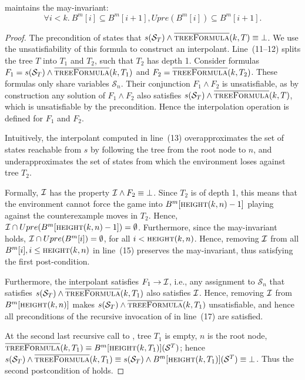 \begin{proposition}
     maintains the may-invariant: $$\forall i<k.~B^m[i] \subseteq B^m[i+1], Upre(B^m[i]) \subseteq B^m[i+1].$$
\end{proposition}
\begin{proof}
    The precondition of  states that $s(\mathcal{S}_T) \land \textsc{$\overline{\mbox{treeFormula}}$}(k, T) \equiv \bot$. We use the unsatisfiability of this formula to construct an interpolant.  Line~(11--12) splits the tree $T$ into $T_1$ and $T_2$, such that $T_2$ has depth 1.  Consider formulas $F_1=s(\mathcal{S}_T) \land \textsc{$\overline{\mbox{treeFormula}}$}(k, T_1)$ and $F_2 = \textsc{$\overline{\mbox{treeFormula}}$}(k, T_2)$.  These formulas only share variables $\mathcal{S}_n$.  Their conjunction $F_1 \land F_2$ is unsatisfiable, as by construction any solution of $F_1 \land F_2$ also satisfies $s(\mathcal{S}_T) \land \textsc{$\overline{\mbox{treeFormula}}$}(k, T)$, which is unsatisfiable by the precondition.  Hence the interpolation operation is defined for $F_1$ and $F_2$.  

Intuitively, the interpolant computed in line~(13) overapproximates the set of states reachable from $s$ by following the tree from the root node to $n$, and underapproximates the set of states from which the environment loses against tree $T_2$.  

Formally, $\mathcal{I}$ has the property $\mathcal{I} \land F_2 \equiv \bot$.  Since $T_2$ is of depth 1, this means that the environment cannot force the game into $B^m[\textsc{height}(k, n)-1]$ playing against the counterexample moves in $T_2$.  Hence, $\mathcal{I} \cap Upre(B^m[\textsc{height}(k, n)-1]) = \emptyset$.  Furthermore, since the may-invariant holds, $\mathcal{I} \cap Upre(B^m[i]) = \emptyset$, for all $i < \textsc{height}(k, n)$.  Hence, removing $\mathcal{I}$ from all $B^m[i], i\leq \textsc{height}(k, n)$ in line~(15) preserves the may-invariant, thus satisfying the first post-condition.

Furthermore, the interpolant satisfies $F_1 \rightarrow \mathcal{I}$, i.e., any assignment to $\mathcal{S}_n$ that satisfies $s(\mathcal{S}_T) \land \textsc{$\overline{\mbox{treeFormula}}$}(k, T_1)$ also satisfies $\mathcal{I}$.  Hence, removing $\mathcal{I}$ from $B^m[\textsc{height}(k, n)]$ makes $s(\mathcal{S}_T) \land \textsc{$\overline{\mbox{treeFormula}}$}(k, T_1)$ unsatisfiable, and hence all preconditions of the recursive invocation of \textsc{} in line~(17) are satisfied.  

At the second last recursive call to \textsc{}, tree $T_1$ is empty, $n$ is the root node, $\textsc{$\overline{\mbox{treeFormula}}$}(k, T_1) \equiv B^m[\textsc{height}(k, T_1)](\mathcal{S}^T)$; hence $s(\mathcal{S}_T) \land \textsc{$\overline{\mbox{treeFormula}}$}(k, T_1) \equiv s(\mathcal{S}_T) \land B^m[\textsc{height}(k, T_1)](\mathcal{S}^T) \equiv \bot$.  Thus the second postcondition of \textsc{} holds.

\end{proof}


